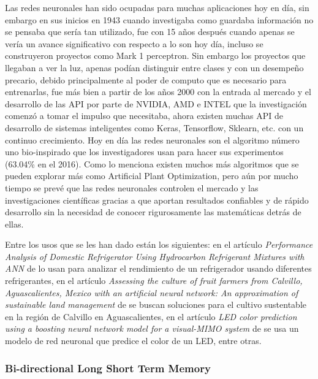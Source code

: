 \par Las redes neuronales han sido ocupadas para muchas aplicaciones hoy en día, sin embargo en sus inicios en 1943 cuando \cite{mcculloch1943logical} investigaba como guardaba información no se pensaba que sería tan utilizado, fue con \cite{rosenblatt1958perceptron} 15 años después cuando apenas se vería un avance significativo con respecto a lo son hoy día, incluso se construyeron proyectos como Mark 1 perceptron. Sin embargo los proyectos que llegaban a ver la luz, apenas podían distinguir entre clases y con un desempeño precario, debido principalmente al poder de computo que es necesario para entrenarlas, fue más bien a partir de los años 2000 con la entrada al mercado y el desarrollo de las API por parte de NVIDIA, AMD e INTEL que la investigación comenzó a tomar el impulso que necesitaba, ahora existen muchas API de desarrollo de sistemas inteligentes como Keras, Tensorflow, Sklearn, etc. con un continuo crecimiento. Hoy en día las redes neuronales son el algoritmo número uno bio-inspirado que los investigadores usan para hacer sus experimentos (63.04\% en el 2016). Como lo menciona \cite{kar2016bio} existen muchos más algoritmos que se pueden explorar más como Artificial Plant Optimization, pero aún por mucho tiempo se prevé que las redes neuronales controlen el mercado y las investigaciones científicas gracias a que aportan resultados confiables y de rápido desarrollo sin la necesidad de conocer rigurosamente las matemáticas detrás de ellas. 
			
\par Entre los usos que se les han dado están los siguientes: en el artículo \textit{Performance Analysis of Domestic Refrigerator Using Hydrocarbon Refrigerant Mixtures with ANN} de \cite{reddy2019performance} lo usan para analizar el rendimiento de un refrigerador usando diferentes refrigerantes, en el artículo \textit{Assessing the culture of fruit farmers from Calvillo, Aguascalientes, Mexico with an artificial neural network: An approximation of sustainable land management} de \cite{santos2019assessing} se buscan soluciones para el cultivo sustentable en la región de Calvillo en Aguascalientes, en el artículo \textit{LED color prediction using a boosting neural network model for a visual-MIMO system} de \cite{banik2018led} se usa un modelo de red neuronal que predice el color de un LED, entre otras. 
			
\subsubsection{Bi-directional Long Short Term Memory}
			
